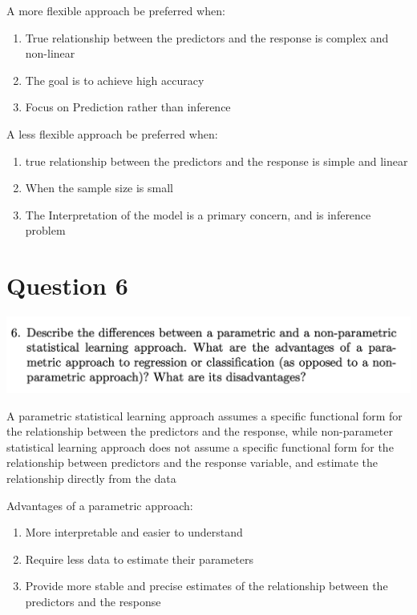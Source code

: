 \documentclass[
]{article}
\providecommand{\tightlist}{%
  \setlength{\itemsep}{0pt}\setlength{\parskip}{0pt}}
\begin{document}
A more flexible approach be preferred when:

\begin{enumerate}
\def\labelenumi{\arabic{enumi}.}
\tightlist
\item
  True relationship between the predictors and the response is complex
  and non-linear
\item
  The goal is to achieve high accuracy
\item
  Focus on Prediction rather than inference
\end{enumerate}

A less flexible approach be preferred when:

\begin{enumerate}
\def\labelenumi{\arabic{enumi}.}
\tightlist
\item
  true relationship between the predictors and the response is simple
  and linear
\item
  When the sample size is small
\item
  The Interpretation of the model is a primary concern, and is inference
  problem
\end{enumerate}

\hypertarget{question-6}{%
\section{Question 6}\label{question-6}}

\includegraphics{images/image-1010253318.png}

A parametric statistical learning approach assumes a specific functional
form for the relationship between the predictors and the response, while
non-parameter statistical learning approach does not assume a specific
functional form for the relationship between predictors and the response
variable, and estimate the relationship directly from the data

Advantages of a parametric approach:

\begin{enumerate}
\def\labelenumi{\arabic{enumi}.}
\tightlist
\item
  More interpretable and easier to understand
\item
  Require less data to estimate their parameters
\item
  Provide more stable and precise estimates of the relationship between
  the predictors and the response
\end{enumerate}
\end{document}
